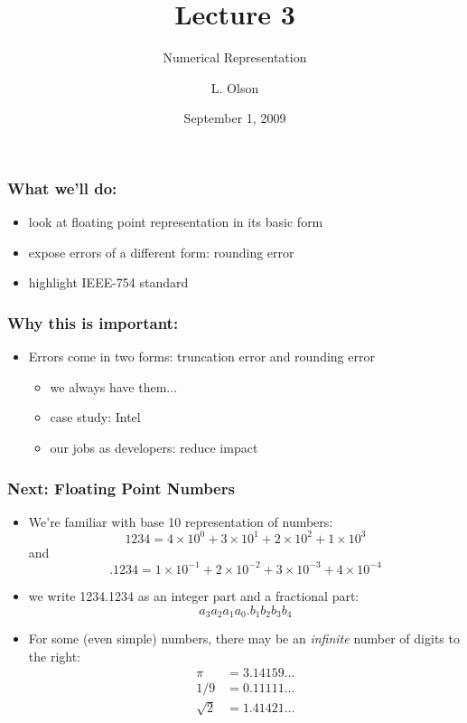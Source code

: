 \documentclass[10pt]{beamer}
\author{L. Olson}
\institute[UIUC]
{Department of Computer Science\\
University of Illinois at Urbana-Champaign\\
\vspace{0.5cm}
}
\title[CS 357]{Lecture 3}
\subtitle{Numerical Representation}
\date{September 1, 2009}
\begin{document}
\begin{frame}
  \titlepage
\end{frame}
\begin{frame}
\frametitle{What we'll do:}
\begin{itemize}
  \item look at floating point representation in its basic form
  \item expose errors of a different form: rounding error
  \item highlight IEEE-754 standard
\end{itemize}
\end{frame}
\begin{frame}
\frametitle{Why this is important:}
\begin{itemize} 
  \item Errors come in two forms: truncation error and rounding error
    \begin{itemize}
      \item we always have them...
      \item case study: Intel
      \item our jobs as developers: reduce impact
    \end{itemize}
\end{itemize}
\end{frame}
\begin{frame}
\frametitle{Next: Floating Point Numbers}
  \begin{itemize}
    \item We're familiar with base 10 representation of numbers:
      \begin{equation*}
        1234 = 4\times 10^0 + 3\times 10^1 + 2\times 10^2 + 1\times 10^3
      \end{equation*}
      and
      \begin{equation*}
        .1234 = 1\times 10^{-1} + 2\times 10^{-2} + 3\times 10^{-3} +
4\times 10^{-4}
\end{equation*}
    \item we write 1234.1234 as an integer part and a fractional part:
      \begin{equation*}
        a_3a_2a_1a_0.b_1b_2b_3b_4
\end{equation*}
    \item For some (even simple) numbers, there may be an
\emph{infinite} number of digits to the right:
      \begin{align*}  
          \pi & = 3.14159\dots\\
          1/9 & = 0.11111\dots\\
          \sqrt{2} & = 1.41421\dots\\  
      \end{align*}
\end{itemize}
\end{frame}
\end{document}
